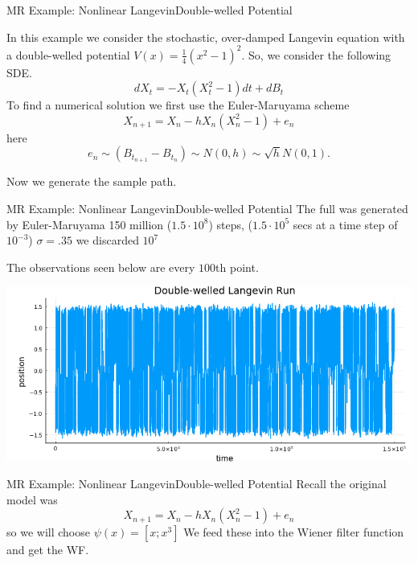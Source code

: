 \documentclass{beamer}  %
\begin{document}

\begin{frame}{MR Example: Nonlinear Langevin}{Double-welled Potential}
	
		In this example we consider the stochastic, over-damped Langevin equation with a double-welled potential $V(x) = \frac{1}{4}(x^2 - 1)^2$. So, we consider the following SDE. 
		$$dX_t = -X_t(X_t^2 - 1)dt + dB_t$$
		To find a numerical solution we first use the Euler-Maruyama scheme 
		$$X_{n+1} = X_n - h X_n(X_n^2 - 1) + e_n$$
		here $$e_n \sim (B_{t_{n+1}}-B_{t_{n}}) \sim N(0,h) \sim \sqrt{h} N(0,1).$$
		
		Now we generate the sample path.
\end{frame}


\begin{frame}{MR Example: Nonlinear Langevin}{Double-welled Potential}
	The full was generated by Euler-Maruyama 150 million ($1.5\cdot 10^8$) steps, ($1.5\cdot 10^5$ secs at a time step of $10^{-3}$) $\sigma = .35$ we discarded $10^7$
	
	The observations seen below are every $100$th point.
	
	\bigskip
	
	\includegraphics[scale=.6]{fig/RunNLL.png}
\end{frame}


\begin{frame}{MR Example: Nonlinear Langevin}{Double-welled Potential}
		Recall the original model was
		$$X_{n+1} = X_n - h X_n(X_n^2 - 1) + e_n$$
		so we will choose $\psi(x) = [x;x^3]$
		We feed these into the Wiener filter function and get the WF.
		
		
\end{frame}



\end{document}
